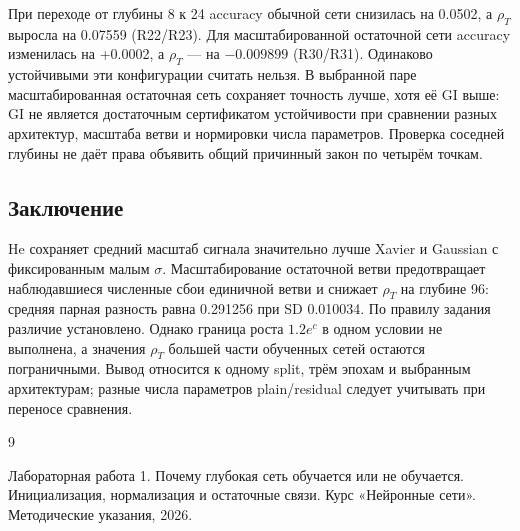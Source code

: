 При переходе от глубины 8 к 24 accuracy обычной сети снизилась на 0.0502, а $\rho_T$ выросла на 0.07559 (R22/R23). Для масштабированной остаточной сети accuracy изменилась на +0.0002, а $\rho_T$ --- на $-0.009899$ (R30/R31). Одинаково устойчивыми эти конфигурации считать нельзя. В выбранной паре масштабированная остаточная сеть сохраняет точность лучше, хотя её GI выше: GI не является достаточным сертификатом устойчивости при сравнении разных архитектур, масштаба ветви и нормировки числа параметров. Проверка соседней глубины не даёт права объявить общий причинный закон по четырём точкам.


\subsection*{Заключение}
He сохраняет средний масштаб сигнала значительно лучше Xavier и Gaussian с фиксированным малым $\sigma$. Масштабирование остаточной ветви предотвращает наблюдавшиеся численные сбои единичной ветви и снижает $\rho_T$ на глубине 96: средняя парная разность равна 0.291256 при SD 0.010034. По правилу задания различие установлено. Однако граница роста $1.2e^c$ в одном условии не выполнена, а значения $\rho_T$ большей части обученных сетей остаются пограничными. Вывод относится к одному split, трём эпохам и выбранным архитектурам; разные числа параметров plain/residual следует учитывать при переносе сравнения.
\clearpage
\renewcommand{\refname}{Список использованных источников}
\begin{thebibliography}{9}
 Лабораторная работа 1. Почему глубокая сеть обучается или не обучается. Инициализация, нормализация и остаточные связи. Курс «Нейронные сети». Методические указания, 2026.
\end{thebibliography}
\clearpage
